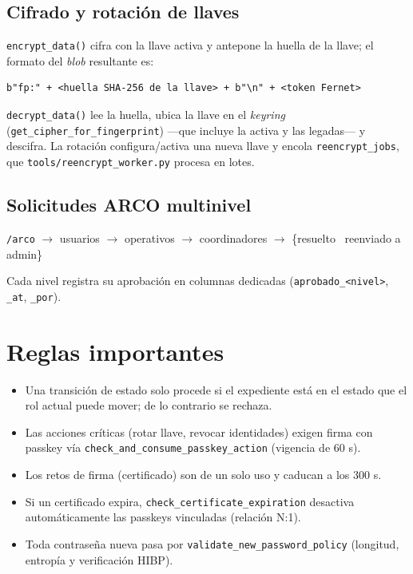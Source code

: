 \documentclass[10pt,letterpaper]{report}
\begin{document}
\subsection*{Cifrado y rotaci\'on de llaves}
\texttt{encrypt\_data()} cifra con la llave activa y antepone la huella de la llave; el formato del
\emph{blob} resultante es:
\begin{lstlisting}[style=plain]
b"fp:" + <huella SHA-256 de la llave> + b"\n" + <token Fernet>
\end{lstlisting}
\texttt{decrypt\_data()} lee la huella, ubica la llave en el \emph{keyring}
(\texttt{get\_cipher\_for\_fingerprint}) ---que incluye la activa y las legadas--- y descifra. La
rotaci\'on configura/activa una nueva llave y encola \texttt{reencrypt\_jobs}, que
\texttt{tools/reencrypt\_worker.py} procesa en lotes.

\subsection*{Solicitudes ARCO multinivel}
\begin{center}
\texttt{/arco} $\rightarrow$ usuarios $\rightarrow$ operativos $\rightarrow$ coordinadores
$\rightarrow$ \{resuelto \textbar\ reenviado a admin\}
\end{center}
Cada nivel registra su aprobaci\'on en columnas dedicadas (\texttt{aprobado\_<nivel>}, \texttt{\_at},
\texttt{\_por}).

\section{Reglas importantes}
\begin{itemize}
  \item Una transici\'on de estado solo procede si el expediente est\'a en el estado que el rol actual
  puede mover; de lo contrario se rechaza.
  \item Las acciones cr\'iticas (rotar llave, revocar identidades) exigen firma con passkey v\'ia
  \texttt{check\_and\_consume\_passkey\_action} (vigencia de 60 s).
  \item Los retos de firma (certificado) son de un solo uso y caducan a los 300 s.
  \item Si un certificado expira, \texttt{check\_certificate\_expiration} desactiva autom\'aticamente
  las passkeys vinculadas (relaci\'on N:1).
  \item Toda contrase\~na nueva pasa por \texttt{validate\_new\_password\_policy} (longitud, entrop\'ia
  y verificaci\'on HIBP).
\end{itemize}
\end{document}
